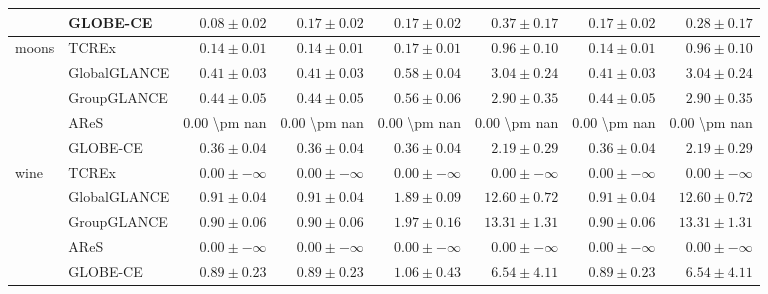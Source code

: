 \begin{table}[ht]
\begin{center}
\begin{sc}
\begin{scriptsize}
\begin{tabular}{l|l|rrrrrr}
 & GLOBE-CE & $0.08\pm{0.02}$ & $0.17\pm{0.02}$ & $0.17\pm{0.02}$ & $0.37\pm{0.17}$ & $0.17\pm{0.02}$ & $0.28\pm{0.17}$ \\
\midrule
\multirow{5}{*}{moons} & TCREx & $\boldsymbol{0.14\pm{0.01}}$ & $\boldsymbol{0.14\pm{0.01}}$ & $\boldsymbol{0.17\pm{0.01}}$ & $\boldsymbol{0.96\pm{0.10}}$ & $\boldsymbol{0.14\pm{0.01}}$ & $\boldsymbol{0.96\pm{0.10}}$ \\
 & GlobalGLANCE & $0.41\pm{0.03}$ & $0.41\pm{0.03}$ & $0.58\pm{0.04}$ & $3.04\pm{0.24}$ & $0.41\pm{0.03}$ & $3.04\pm{0.24}$ \\
 & GroupGLANCE & $0.44\pm{0.05}$ & $0.44\pm{0.05}$ & $0.56\pm{0.06}$ & $2.90\pm{0.35}$ & $0.44\pm{0.05}$ & $2.90\pm{0.35}$ \\
 & AReS & 0.00 \textbackslash{}pm nan & 0.00 \textbackslash{}pm nan & 0.00 \textbackslash{}pm nan & 0.00 \textbackslash{}pm nan & 0.00 \textbackslash{}pm nan & 0.00 \textbackslash{}pm nan \\
 & GLOBE-CE & $0.36\pm{0.04}$ & $0.36\pm{0.04}$ & $0.36\pm{0.04}$ & $2.19\pm{0.29}$ & $0.36\pm{0.04}$ & $2.19\pm{0.29}$ \\
\midrule
\multirow{5}{*}{wine} & TCREx & $\boldsymbol{0.00\pm{-\infty}}$ & $\boldsymbol{0.00\pm{-\infty}}$ & $\boldsymbol{0.00\pm{-\infty}}$ & $\boldsymbol{0.00\pm{-\infty}}$ & $\boldsymbol{0.00\pm{-\infty}}$ & $\boldsymbol{0.00\pm{-\infty}}$ \\
 & GlobalGLANCE & $0.91\pm{0.04}$ & $0.91\pm{0.04}$ & $1.89\pm{0.09}$ & $12.60\pm{0.72}$ & $0.91\pm{0.04}$ & $12.60\pm{0.72}$ \\
 & GroupGLANCE & $0.90\pm{0.06}$ & $0.90\pm{0.06}$ & $1.97\pm{0.16}$ & $13.31\pm{1.31}$ & $0.90\pm{0.06}$ & $13.31\pm{1.31}$ \\
 & AReS & $\boldsymbol{0.00\pm{-\infty}}$ & $\boldsymbol{0.00\pm{-\infty}}$ & $\boldsymbol{0.00\pm{-\infty}}$ & $\boldsymbol{0.00\pm{-\infty}}$ & $\boldsymbol{0.00\pm{-\infty}}$ & $\boldsymbol{0.00\pm{-\infty}}$ \\
 & GLOBE-CE & $0.89\pm{0.23}$ & $0.89\pm{0.23}$ & $1.06\pm{0.43}$ & $6.54\pm{4.11}$ & $0.89\pm{0.23}$ & $6.54\pm{4.11}$ \\
\bottomrule
\end{tabular}
\end{scriptsize}
\end{sc}
\end{center}
\end{table}

